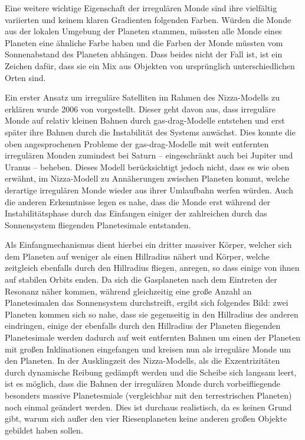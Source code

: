 \documentclass[12pt,a4paper,twoside]{article}
\begin{document}
Eine weitere wichtige Eigenschaft der irregulären Monde sind ihre vielfältig variierten und keinem klaren Gradienten folgenden Farben. Würden die Monde aus der lokalen Umgebung der Planeten stammen, müssten alle Monde eines Planeten eine ähnliche Farbe haben und die Farben der Monde müssten vom Sonnenabstand des Planeten abhängen\cite{Nesvorny2007}. Dass beides nicht der Fall ist, ist ein Zeichen dafür, dass sie ein Mix aus Objekten von ursprünglich unterschiedlichen Orten sind. %

Ein erster Ansatz um irreguläre Satelliten im Rahmen des Nizza-Modells zu erklären wurde 2006 von \cite{Cuk2006} vorgestellt. Dieser geht davon aus, dass irreguläre Monde auf relativ kleinen Bahnen durch \glqq gas-drag\grqq-Modelle entstehen und erst später ihre Bahnen durch die Instabilität des Systems anwächst. Dies konnte die oben angesprochenen Probleme der \glqq gas-drag\grqq-Modelle mit weit entfernten irregulären Monden zumindest bei Saturn – eingeschränkt auch bei Jupiter und Uranus – beheben\cite{Cuk2006}. %
Dieses Modell berücksichtigt jedoch nicht, dass es wie oben erwähnt, im Nizza-Modell zu Annäherungen zwischen Planeten kommt, welche derartige irregulären Monde wieder aus ihrer Umlaufbahn werfen würden. Auch die anderen Erkenntnisse legen es nahe, dass die Monde erst während der Instabilitätsphase durch das Einfangen einiger der zahlreichen durch das Sonnensystem fliegenden Planetesimale entstanden. %

Als Einfangmechanismus dient hierbei ein dritter massiver Körper,
welcher sich dem Planeten auf weniger als einen Hillradius nähert und Körper, %
welche zeitgleich ebenfalls durch den Hillradius fliegen, anregen, so dass einige von ihnen auf stabilen Orbits enden. %
Da sich die Gasplaneten nach dem Eintreten der Resonanz näher kommen, während gleichzeitig eine große Anzahl an Planetesimalen das Sonnensystem durchstreift,
ergibt sich folgendes Bild: zwei Planeten kommen sich so nahe, dass sie gegenseitig in den Hillradius des anderen eindringen,
einige der ebenfalls durch den Hillradius der Planeten fliegenden Planetesimale werden dadurch auf weit entfernten Bahnen um einen der Planeten mit großen Inklinationen eingefangen und %
kreisen nun als irreguläre Monde um den Planeten\cite{Nesvorny2007}.
In der Ausklingzeit des Nizza-Modells, als die Exzentrizitäten durch dynamische Reibung gedämpft werden und die Scheibe sich langsam leert, ist es möglich, dass die Bahnen der irregulären Monde durch vorbeifliegende besonders massive Planetesmiale (vergleichbar mit den terrestrischen Planeten) noch einmal geändert werden. %
Dies ist durchaus realistisch, da es keinen Grund gibt, warum sich außer den vier Riesenplaneten keine anderen großen Objekte gebildet haben sollen\cite{Nesvorny2007}. %
\end{document}
